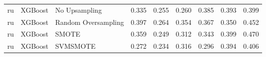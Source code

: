 \begin{tabular}{lllllllll}
      ru &                      XGBoost &       No Upsampling & 0.335 &                     0.255 &                 0.260 &                  0.385 &                                   0.393 &     0.399 \\
      ru &                      XGBoost & Random Oversampling & 0.397 &                     0.264 &                 0.354 &                  0.367 &                                   0.350 &     0.452 \\
      ru &                      XGBoost &               SMOTE & 0.359 &                     0.249 &                 0.312 &                  0.343 &                                   0.399 &     0.470 \\
      ru &                      XGBoost &            SVMSMOTE & 0.272 &                     0.234 &                 0.316 &                  0.296 &                                   0.394 &     0.406 \\
\bottomrule
\end{tabular}
